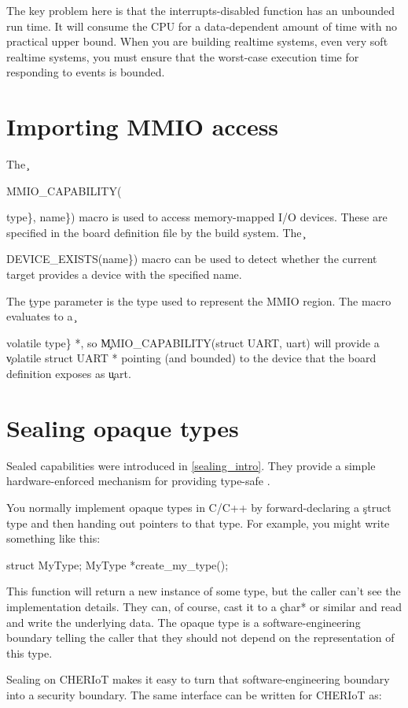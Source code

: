 {{The key problem here is that the interrupts-disabled function has an unbounded run time.
It will consume the CPU for a data-dependent amount of time with no practical upper bound.
When you are building realtime systems, even very soft realtime systems, you must ensure that the worst-case execution time for responding to events is bounded.

\section{Importing MMIO access}

The \c{MMIO_CAPABILITY({type\}, {name\})} macro is used to access memory-mapped I/O devices.
These are specified in the board definition file by the build system.
The \c{DEVICE_EXISTS({name\})} macro can be used to detect whether the current target provides a device with the specified name.

The \c{type} parameter is the type used to represent the MMIO region.
The macro evaluates to a \c{volatile {type\} *}, so \c{MMIO_CAPABILITY(struct UART, uart)} will provide a \c{volatile struct UART *} pointing (and bounded) to the device that the board definition exposes as \c{uart}.

\section{Sealing opaque types}

Sealed capabilities were introduced in \ref{sealing_intro}.
They provide a simple hardware-enforced mechanism for providing type-safe .

You normally implement opaque types in C/C++ by forward-declaring a \c{struct} type and then handing out pointers to that type.
For example, you might write something like this:

\begin{cxxsnippet}
struct MyType;
MyType *create_my_type();
\end{cxxsnippet}

This function will return a new instance of some type, but the caller can't see the implementation details.
They can, of course, cast it to a \c{char*} or similar and read and write the underlying data.
The opaque type is a software-engineering boundary telling the caller that they should not depend on the representation of this type.

Sealing on CHERIoT makes it easy to turn that software-engineering boundary into a security boundary.
The same interface can be written for CHERIoT as:

}}}}}}

